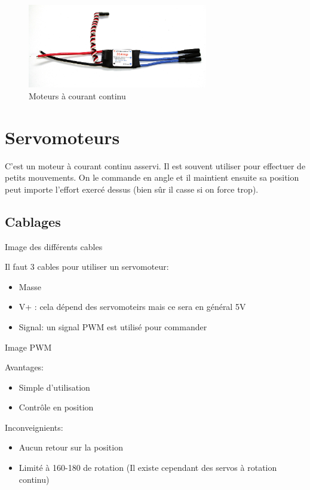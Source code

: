 \documentclass[a4paper, 11pt]{report}
\begin{document}
\begin{figure}[h]
\begin{centering}
\includegraphics[width=0.7\textwidth]{images/ESC.jpg}
\caption{Moteurs à courant continu}
\par\end{centering}
\end{figure}

\section{Servomoteurs}
C'est un moteur à courant continu asservi. Il est souvent utiliser pour effectuer de petits mouvements. On le commande en angle et il maintient ensuite sa position peut importe l'effort exercé dessus (bien sûr il casse si on force trop).

\subsection{Cablages}

Image des différents cables

Il faut 3 cables pour utiliser un servomoteur:
\begin{itemize}
\item Masse
\item V+ : cela dépend des servomoteirs mais ce sera en général 5V
\item Signal: un signal PWM est utilisé pour commander 
\end{itemize}

Image PWM

Avantages:
\begin{itemize}
\item Simple d'utilisation
\item Contrôle en position
\end{itemize}

Inconveignients:
\begin{itemize}
\item Aucun retour sur la position
\item Limité à 160-180 \degre de rotation (Il existe cependant des servos à rotation continu)
\end{itemize}
\end{document}
